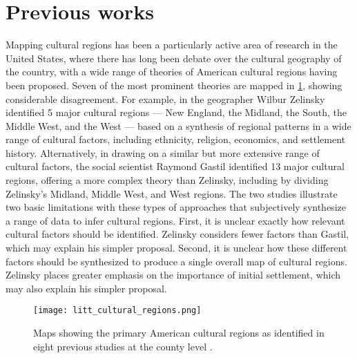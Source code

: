 \documentclass[../thesis.tex]{subfiles}
\begin{document}
\section{Previous works}
Mapping cultural regions has been a particularly active area of research in the United States,
where there has long been debate over the cultural geography of the country, with a wide
range of theories of American cultural regions having been proposed. Seven of the most
prominent theories
\cite{OdumSouthernRegions1936,ElazarCitiesPrairie1970,ZelinskyCulturalGeography1992,GastilCulturalRegions1975,GarreauNineNations1996,LieskeRegionalSubcultures1993,WoodardAmericanNations2012}
are mapped in \cref{fig:litt_cultural_regions}, showing considerable disagreement. For
example, in \cite{ZelinskyCulturalGeography1992} the geographer Wilbur Zelinsky
identified 5 major cultural regions --- New England, the Midland, the South, the Middle
West, and the West --- based on a synthesis of regional patterns in a wide range of
cultural factors, including ethnicity, religion, economics, and settlement history.
Alternatively, in \cite{GastilCulturalRegions1975} drawing on a similar but more
extensive range of cultural factors, the social scientist Raymond Gastil identified 13
major cultural regions, offering a more complex theory than Zelinsky, including by
dividing Zelinsky's Midland, Middle West, and West regions. The two studies illustrate
two basic limitations with these types of approaches that subjectively synthesize a
range of data to infer cultural regions. First, it is unclear exactly how relevant
cultural factors should be identified. Zelinsky considers fewer factors than Gastil,
which may explain his simpler proposal. Second, it is unclear how these different
factors should be synthesized to produce a single overall map of cultural regions.
Zelinsky places greater emphasis on the importance of initial settlement, which may also
explain his simpler proposal.  

\begin{figure}[p!]
\centering
  \texttt{[image: litt\_cultural\_regions.png]}
  \caption{Maps showing the primary American cultural regions as identified in eight
  previous studies at the county level
  \cite{OdumSouthernRegions1936,ElazarCitiesPrairie1970,ZelinskyCulturalGeography1992,GastilCulturalRegions1975,GarreauNineNations1996,LieskeRegionalSubcultures1993,WoodardAmericanNations2012}.}
  \label{fig:litt_cultural_regions}
\end{figure}
\end{document}
